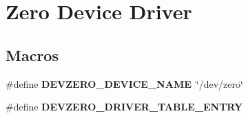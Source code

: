 \hypertarget{group__libmisc__devzero}{}\section{Zero Device Driver}
\label{group__libmisc__devzero}
\subsection*{Macros}
\begin{DoxyCompactItemize}
\item 
\mbox{\label{group__libmisc__devzero_gacfe7ed89454b5dd0b7c5acc3bdfe3882}} 
\#define {\bfseries D\+E\+V\+Z\+E\+R\+O\+\_\+\+D\+E\+V\+I\+C\+E\+\_\+\+N\+A\+ME}~\char`\"{}/dev/zero\char`\"{}
\item 
\#define {\bfseries D\+E\+V\+Z\+E\+R\+O\+\_\+\+D\+R\+I\+V\+E\+R\+\_\+\+T\+A\+B\+L\+E\+\_\+\+E\+N\+T\+RY}
\end{DoxyCompactItemize}
